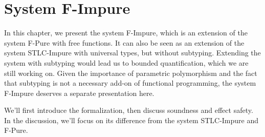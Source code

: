 \section{System F-Impure}

In this chapter, we present the system F-Impure, which is an extension
of the system F-Pure with free functions. It can also be seen as an
extension of the system STLC-Impure with universal types, but without
subtyping. Extending the system with subtyping would lead us to
bounded quantification, which we are still working on. Given the
importance of parametric polymorphism and the fact that subtyping is
not a necessary add-on of functional programming, the system F-Impure
deserves a separate presentation here.

We'll first introduce the formalization, then discuss soundness and
effect safety. In the discussion, we'll focus on its difference from
the system STLC-Impure and F-Pure.


